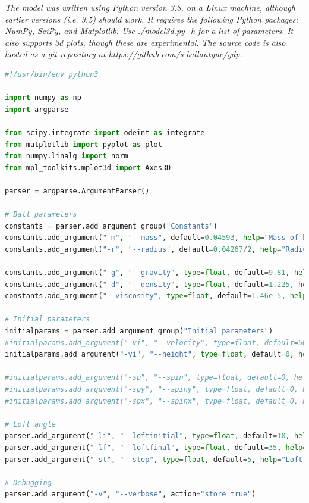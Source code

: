 \documentclass[12pt]{article}
\begin{document}
\textit{The model was written using Python version 3.8, on a Linux machine, although earlier versions (i.e. 3.5) should work. It requires the following Python packages: NumPy, SciPy, and Matplotlib. Use ./model3d.py -h for a list of parameters. It also supports 3d plots, though these are experimental. The source code is also hosted as a git repository at \url{https://github.com/s-ballantyne/gdp}.}
\begin{lstlisting}[language=Python, caption=Python model, style=PythonStyle, basicstyle=\tiny]
#!/usr/bin/env python3

import numpy as np
import argparse

from scipy.integrate import odeint as integrate
from matplotlib import pyplot as plot
from numpy.linalg import norm
from mpl_toolkits.mplot3d import Axes3D

parser = argparse.ArgumentParser()

# Ball parameters
constants = parser.add_argument_group("Constants")
constants.add_argument("-m", "--mass", default=0.04593, help="Mass of ball (kg)")
constants.add_argument("-r", "--radius", default=0.04267/2, help="Radius of ball (m)")

constants.add_argument("-g", "--gravity", type=float, default=9.81, help="For when we get a Mars base (m/s/s)")
constants.add_argument("-d", "--density", type=float, default=1.225, help="Density of air (kg m^-3)")
constants.add_argument("--viscosity", type=float, default=1.46e-5, help="Kinematic viscosity of air")

# Initial parameters
initialparams = parser.add_argument_group("Initial parameters")
#initialparams.add_argument("-vi", "--velocity", type=float, default=50, help="Initial velocity (m/s)")
initialparams.add_argument("-yi", "--height", type=float, default=0, help="Initial height (m)")

#initialparams.add_argument("-sp", "--spin", type=float, default=0, help="Spin (z)")
#initialparams.add_argument("-spy", "--spiny", type=float, default=0, help="Spin (y)")
#initialparams.add_argument("-spx", "--spinx", type=float, default=0, help="Spin (x)")

# Loft angle
parser.add_argument("-li", "--loftinitial", type=float, default=10, help="Loft angle (initial)")
parser.add_argument("-lf", "--loftfinal", type=float, default=35, help="Loft angle (final)")
parser.add_argument("-st", "--step", type=float, default=5, help="Loft angle (step)")

# Debugging
parser.add_argument("-v", "--verbose", action="store_true")


\end{lstlisting}
\end{document}
